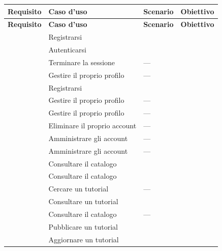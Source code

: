 \begin{longtable}{@{}l L{5.4cm} l L{4.2cm}@{}}
\toprule
\textbf{Requisito} & \textbf{Caso d'uso} & \textbf{Scenario} &
\textbf{Obiettivo} \\
\midrule
\endfirsthead
\toprule
\textbf{Requisito} & \textbf{Caso d'uso} & \textbf{Scenario} &
\textbf{Obiettivo} \\
\midrule
\endhead
\bottomrule
\endlastfoot

  &  Registrarsi                &  &  \\
  &  Autenticarsi               &  &  \\
  &  Terminare la sessione      & ---        &  \\
  &  Gestire il proprio profilo & ---        &  \\
  &  Registrarsi                &  &  \\
  &  Gestire il proprio profilo & ---        &  \\
  &  Gestire il proprio profilo & ---        &  \\
  &  Eliminare il proprio account & ---      &  \\
  &  Amministrare gli account   & ---        &  \\
 &  Amministrare gli account   & ---        &  \\
\midrule
{}  &  Consultare il catalogo     &  &  \\
  &  Consultare il catalogo     &  &  \\
  &  Cercare un tutorial        & ---        &  \\
  &  Consultare un tutorial     &  &  \\
  &  Consultare il catalogo     & ---        &  \\
  &  Pubblicare un tutorial     &  &  \\
  &  Aggiornare un tutorial     &  &  \\

\end{longtable}
